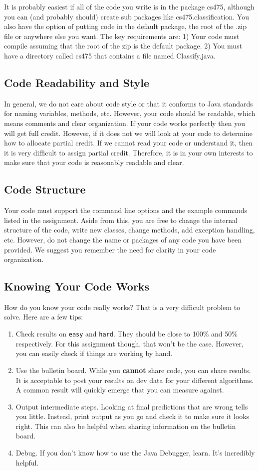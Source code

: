\documentclass[11pt]{article}
\begin{document}
It is probably easiest if all of the code you write is in the package cs475, although you can (and probably should) create sub packages like cs475.classification. You also have the option of putting code in the default package, the root of the .zip file or anywhere else you want. The key requirements are:
1) Your code must compile assuming that the root of the zip is the default package.
2) You must have a directory called cs475 that contains a file named Classify.java.

\subsection{Code Readability and Style}
In general, we do not care about code style or that it conforms to Java standards for naming variables, methods, etc. However, your code should be readable, which means comments and clear organization. If your code works perfectly then you will get full credit. However, if it does not we will look at your code to determine how to allocate partial credit. If we cannot read your code or understand it, then it is very difficult to assign partial credit. Therefore, it is in your own interests to make sure that your code is reasonably readable and clear.

\subsection{Code Structure}
Your code must support the command line options and the example commands listed in the assignment. Aside from this, you are free to change the internal structure of the code, write new classes, change methods, add exception handling, etc. However, do not change the name or packages of any code you have been provided. We suggest you remember the need for clarity in your code organization.

\subsection{Knowing Your Code Works}
How do you know your code really works? That is a very difficult problem to solve. Here are a few tips:
\begin{enumerate}
\item Check results on {\tt easy} and {\tt hard}. They should be close to 100\% and 50\% respectively. For this assignment though, that won't be the case. However, you can easily check if things are working by hand.
\item Use the bulletin board. While you {\bf cannot} share code, you can share results. It is acceptable to post your results on dev data for your different algorithms. A common result will quickly emerge that you can measure against.
\item Output intermediate steps. Looking at final predictions that are wrong tells you little. Instead, print output as you go and check it to make sure it looks right. This can also be helpful when sharing information on the bulletin board.
\item Debug. If you don't know how to use the Java Debugger, learn. It's incredibly helpful.
\end{enumerate}
\end{document}

